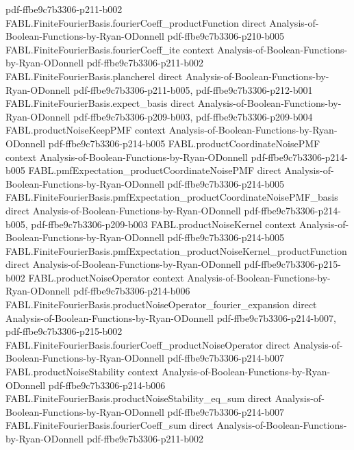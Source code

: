 \begin{theorem}
  {pdf-ffbe9c7b3306-p211-b002}
\proofstep
  {FABL.FiniteFourierBasis.fourierCoeff_productFunction}
  {direct}
  {Analysis-of-Boolean-Functions-by-Ryan-ODonnell}
  {pdf-ffbe9c7b3306-p210-b005}
\proofstep
  {FABL.FiniteFourierBasis.fourierCoeff_ite}
  {context}
  {Analysis-of-Boolean-Functions-by-Ryan-ODonnell}
  {pdf-ffbe9c7b3306-p211-b002}
\proofstep
  {FABL.FiniteFourierBasis.plancherel}
  {direct}
  {Analysis-of-Boolean-Functions-by-Ryan-ODonnell}
  {pdf-ffbe9c7b3306-p211-b005,
    pdf-ffbe9c7b3306-p212-b001}
\proofstep
  {FABL.FiniteFourierBasis.expect_basis}
  {direct}
  {Analysis-of-Boolean-Functions-by-Ryan-ODonnell}
  {pdf-ffbe9c7b3306-p209-b003,
    pdf-ffbe9c7b3306-p209-b004}
\proofstep
  {FABL.productNoiseKeepPMF}
  {context}
  {Analysis-of-Boolean-Functions-by-Ryan-ODonnell}
  {pdf-ffbe9c7b3306-p214-b005}
\proofstep
  {FABL.productCoordinateNoisePMF}
  {context}
  {Analysis-of-Boolean-Functions-by-Ryan-ODonnell}
  {pdf-ffbe9c7b3306-p214-b005}
\proofstep
  {FABL.pmfExpectation_productCoordinateNoisePMF}
  {direct}
  {Analysis-of-Boolean-Functions-by-Ryan-ODonnell}
  {pdf-ffbe9c7b3306-p214-b005}
\proofstep
  {FABL.FiniteFourierBasis.pmfExpectation_productCoordinateNoisePMF_basis}
  {direct}
  {Analysis-of-Boolean-Functions-by-Ryan-ODonnell}
  {pdf-ffbe9c7b3306-p214-b005,
    pdf-ffbe9c7b3306-p209-b003}
\proofstep
  {FABL.productNoiseKernel}
  {context}
  {Analysis-of-Boolean-Functions-by-Ryan-ODonnell}
  {pdf-ffbe9c7b3306-p214-b005}
\proofstep
  {FABL.FiniteFourierBasis.pmfExpectation_productNoiseKernel_productFunction}
  {direct}
  {Analysis-of-Boolean-Functions-by-Ryan-ODonnell}
  {pdf-ffbe9c7b3306-p215-b002}
\proofstep
  {FABL.productNoiseOperator}
  {context}
  {Analysis-of-Boolean-Functions-by-Ryan-ODonnell}
  {pdf-ffbe9c7b3306-p214-b006}
\proofstep
  {FABL.FiniteFourierBasis.productNoiseOperator_fourier_expansion}
  {direct}
  {Analysis-of-Boolean-Functions-by-Ryan-ODonnell}
  {pdf-ffbe9c7b3306-p214-b007,
    pdf-ffbe9c7b3306-p215-b002}
\proofstep
  {FABL.FiniteFourierBasis.fourierCoeff_productNoiseOperator}
  {direct}
  {Analysis-of-Boolean-Functions-by-Ryan-ODonnell}
  {pdf-ffbe9c7b3306-p214-b007}
\proofstep
  {FABL.productNoiseStability}
  {context}
  {Analysis-of-Boolean-Functions-by-Ryan-ODonnell}
  {pdf-ffbe9c7b3306-p214-b006}
\proofstep
  {FABL.FiniteFourierBasis.productNoiseStability_eq_sum}
  {direct}
  {Analysis-of-Boolean-Functions-by-Ryan-ODonnell}
  {pdf-ffbe9c7b3306-p214-b007}
\proofstep
  {FABL.FiniteFourierBasis.fourierCoeff_sum}
  {direct}
  {Analysis-of-Boolean-Functions-by-Ryan-ODonnell}
  {pdf-ffbe9c7b3306-p211-b002}
\proofstep

\end{theorem}
